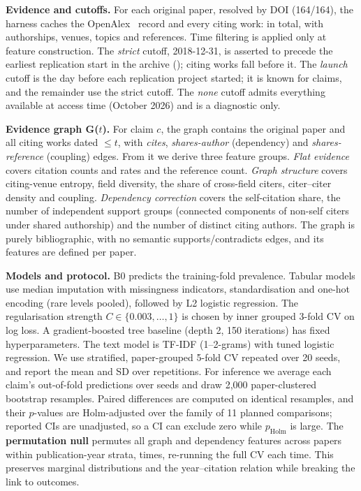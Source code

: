 \documentclass[conference]{IEEEtran}
\begin{document}
\textbf{Evidence and cutoffs.} For each original paper, resolved by DOI (164/164), the harness caches the OpenAlex~\cite{priem2022} record and every citing work: \nCiting{} in total, with authorships, venues, topics and references. Time filtering is applied only at feature construction. The \emph{strict} cutoff, 2018-12-31, is asserted to precede the earliest replication start in the archive (\earliestStart{}); \nCitingStrict{} citing works fall before it. The \emph{launch} cutoff is the day before each replication project started; it is known for \nLaunch{} claims, and the remainder use the strict cutoff. The \emph{none} cutoff admits everything available at access time (October 2026) and is a diagnostic only.

\textbf{Evidence graph G($t$).} For claim $c$, the graph contains the original paper and all citing works dated $\le t$, with \emph{cites}, \emph{shares-author} (dependency) and \emph{shares-reference} (coupling) edges. From it we derive three feature groups. \emph{Flat evidence} covers citation counts and rates and the reference count. \emph{Graph structure} covers citing-venue entropy, field diversity, the share of cross-field citers, citer--citer density and coupling. \emph{Dependency correction} covers the self-citation share, the number of independent support groups (connected components of non-self citers under shared authorship) and the number of distinct citing authors. The graph is purely bibliographic, with no semantic supports/contradicts edges, and its features are defined per paper.

\textbf{Models and protocol.} B0 predicts the training-fold prevalence. Tabular models use median imputation with missingness indicators, standardisation and one-hot encoding (rare levels pooled), followed by L2 logistic regression. The regularisation strength $C\in\{0.003,\dots,1\}$ is chosen by inner grouped 3-fold CV on log loss. A gradient-boosted tree baseline (depth 2, 150 iterations) has fixed hyperparameters. The text model is TF-IDF (1--2-grams) with tuned logistic regression. We use stratified, paper-grouped 5-fold CV repeated over 20 seeds, and report the mean and SD over repetitions. For inference we average each claim's out-of-fold predictions over seeds and draw 2{,}000 paper-clustered bootstrap resamples. Paired differences are computed on identical resamples, and their $p$-values are Holm-adjusted over the family of 11 planned comparisons; reported CIs are unadjusted, so a CI can exclude zero while $p_{\mathrm{Holm}}$ is large. The \textbf{permutation null} permutes all graph and dependency features across papers within publication-year strata, \permK{} times, re-running the full CV each time. This preserves marginal distributions and the year--citation relation while breaking the link to outcomes.
\end{document}
